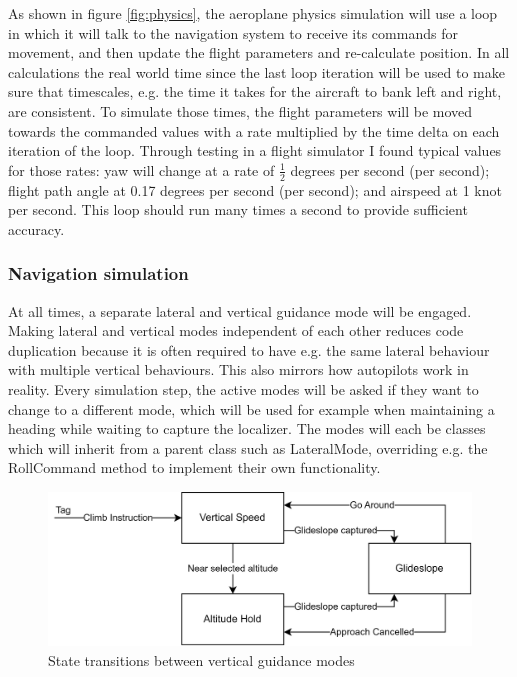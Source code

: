 \documentclass{article}
\begin{document}
As shown in figure \ref{fig:physics}, the aeroplane physics simulation will use a loop in which it will talk to the navigation system to receive its commands for movement, and then update the flight parameters and re-calculate position.
In all calculations the real world time since the last loop iteration will be used to make sure that timescales, e.g. the time it takes for the aircraft to bank left and right, are consistent.
To simulate those times, the flight parameters will be moved towards the commanded values with a rate multiplied by the time delta on each iteration of the loop.
Through testing in a flight simulator I found typical values for those rates: yaw will change at a rate of $\frac{1}{2}$ degrees per second (per second); flight path angle at 0.17 degrees per second (per second); and airspeed at 1 knot per second.
This loop should run many times a second to provide sufficient accuracy.

\subsubsection{Navigation simulation}
At all times, a separate lateral and vertical guidance mode will be engaged.
Making lateral and vertical modes independent of each other reduces code duplication because it is often required to have e.g. the same lateral behaviour with multiple vertical behaviours. This also mirrors how autopilots work in reality.
Every simulation step, the active modes will be asked if they want to change to a different mode, which will be used for example when maintaining a heading while waiting to capture the localizer.
The modes will each be classes which will inherit from a parent class such as LateralMode, overriding e.g. the RollCommand method to implement their own functionality.

\begin{figure}[H]
\centering
\includegraphics{diagrams/vertnav.png}
\caption{\label{fig:vertnav}State transitions between vertical guidance modes}
\end{figure}
\end{document}
